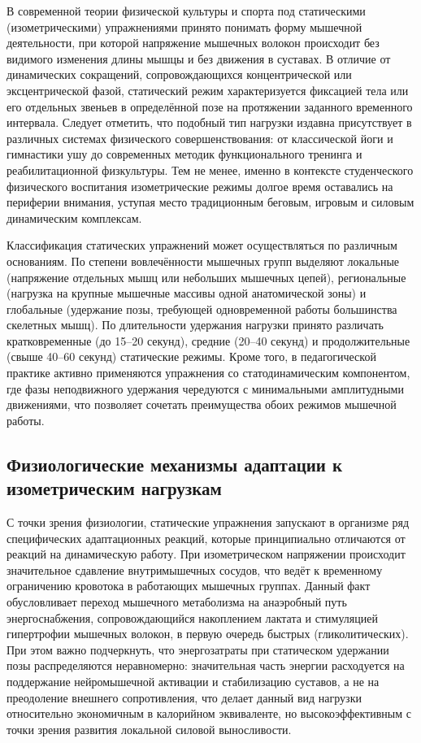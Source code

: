 \documentclass[oneside,a4paper,14pt]{extarticle}
\begin{document}
В современной теории физической культуры и спорта под статическими (изометрическими) упражнениями принято понимать форму мышечной деятельности, при которой напряжение мышечных волокон происходит без видимого изменения длины мышцы и без движения в суставах. В отличие от динамических сокращений, сопровождающихся концентрической или эксцентрической фазой, статический режим характеризуется фиксацией тела или его отдельных звеньев в определённой позе на протяжении заданного временного интервала. Следует отметить, что подобный тип нагрузки издавна присутствует в различных системах физического совершенствования: от классической йоги и гимнастики ушу до современных методик функционального тренинга и реабилитационной физкультуры. Тем не менее, именно в контексте студенческого физического воспитания изометрические режимы долгое время оставались на периферии внимания, уступая место традиционным беговым, игровым и силовым динамическим комплексам.

Классификация статических упражнений может осуществляться по различным основаниям. По степени вовлечённости мышечных групп выделяют локальные (напряжение отдельных мышц или небольших мышечных цепей), региональные (нагрузка на крупные мышечные массивы одной анатомической зоны) и глобальные (удержание позы, требующей одновременной работы большинства скелетных мышц). По длительности удержания нагрузки принято различать кратковременные (до 15--20 секунд), средние (20--40 секунд) и продолжительные (свыше 40--60 секунд) статические режимы. Кроме того, в педагогической практике активно применяются упражнения со статодинамическим компонентом, где фазы неподвижного удержания чередуются с минимальными амплитудными движениями, что позволяет сочетать преимущества обоих режимов мышечной работы.

\subsection{Физиологические механизмы адаптации к изометрическим нагрузкам}

С точки зрения физиологии, статические упражнения запускают в организме ряд специфических адаптационных реакций, которые принципиально отличаются от реакций на динамическую работу. При изометрическом напряжении происходит значительное сдавление внутримышечных сосудов, что ведёт к временному ограничению кровотока в работающих мышечных группах. Данный факт обусловливает переход мышечного метаболизма на анаэробный путь энергоснабжения, сопровождающийся накоплением лактата и стимуляцией гипертрофии мышечных волокон, в первую очередь быстрых (гликолитических). При этом важно подчеркнуть, что энергозатраты при статическом удержании позы распределяются неравномерно: значительная часть энергии расходуется на поддержание нейромышечной активации и стабилизацию суставов, а не на преодоление внешнего сопротивления, что делает данный вид нагрузки относительно экономичным в калорийном эквиваленте, но высокоэффективным с точки зрения развития локальной силовой выносливости.
\end{document}
